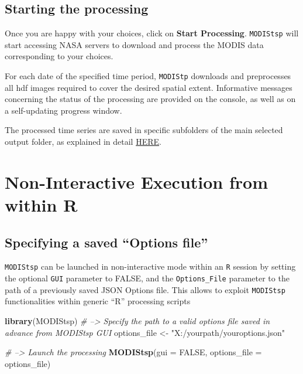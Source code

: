 \documentclass[]{article}
\newenvironment{Shaded}{\begin{snugshade}}{\end{snugshade}}
\newcommand{\KeywordTok}[1]{\textcolor[rgb]{0.13,0.29,0.53}{\textbf{#1}}}
\newcommand{\DataTypeTok}[1]{\textcolor[rgb]{0.13,0.29,0.53}{#1}}
\newcommand{\StringTok}[1]{\textcolor[rgb]{0.31,0.60,0.02}{#1}}
\newcommand{\CommentTok}[1]{\textcolor[rgb]{0.56,0.35,0.01}{\textit{#1}}}
\newcommand{\OtherTok}[1]{\textcolor[rgb]{0.56,0.35,0.01}{#1}}
\newcommand{\NormalTok}[1]{#1}
\begin{document}
\subsection{\texorpdfstring{\textbf{Starting the
processing}}{Starting the processing}}\label{starting-the-processing}

Once you are happy with your choices, click on \textbf{Start
Processing}. \texttt{MODIStsp} will start accessing NASA servers to
download and process the MODIS data corresponding to your choices.

For each date of the specified time period, \texttt{MODIStp} downloads
and preprocesses all hdf images required to cover the desired spatial
extent. Informative messages concerning the status of the processing are
provided on the console, as well as on a self-updating progress window.

The processed time series are saved in specific subfolders of the main
selected output folder, as explained in detail
\href{articles/output.html}{HERE}.

\section{Non-Interactive Execution from within
R}\label{non-interactive-execution-from-within-r}

\subsection{\texorpdfstring{Specifying a saved ``Options
file''}{Specifying a saved Options file}}\label{specifying-a-saved-options-file}

\texttt{MODIStsp} can be launched in non-interactive mode within an
\texttt{R} session by setting the optional \texttt{GUI} parameter to
FALSE, and the \texttt{Options\_File} parameter to the path of a
previously saved JSON Options file. This allows to exploit
\texttt{MODIStsp} functionalities within generic ``R'' processing
scripts

\begin{Shaded}
\begin{Highlighting}[]
\KeywordTok{library}\NormalTok{(MODIStsp) }
\CommentTok{# --> Specify the path to a valid options file saved in advance from MODIStsp GUI }
\NormalTok{options_file <-}\StringTok{ "X:/yourpath/youroptions.json"} 
  
\CommentTok{# --> Launch the processing}
\KeywordTok{MODIStsp}\NormalTok{(}\DataTypeTok{gui =} \OtherTok{FALSE}\NormalTok{, }\DataTypeTok{options_file =}\NormalTok{ options_file)}
\end{Highlighting}
\end{Shaded}
\end{document}
